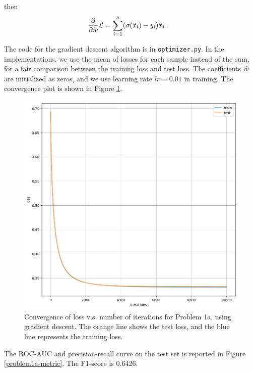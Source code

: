 \documentclass{article}%
\begin{document}
\begin{enumerate}
then
\begin{equation}
\begin{aligned}
\frac{\partial}{\partial \hat{w}}\mathcal{L} &= \sum_{i=1}^{n}(\sigma(\hat{x}_i)-y_i)\hat{x}_i.
\end{aligned}
\end{equation}

The code for the gradient descent algorithm is in \texttt{optimizer.py}. In the implementations, we use the mean of losses for each sample instead of the sum, for a fair comparison between the training loss and test loss. The coefficients $\hat{w}$ are initialized as zeros, and we use learning rate $lr = 0.01$ in training. The convergence plot is shown in Figure \ref{problem1a-convergence}.

\begin{figure}[htbp]
\centering
\includegraphics[scale=0.4]{problem1a.png}
\caption{Convergence of loss v.s. number of iterations for Problem 1a, using gradient descent. The orange line shows the test loss, and the blue line represents the training loss.}
\label{problem1a-convergence}
\end{figure}

The ROC-AUC and precision-recall curve on the test set is reported in Figure \ref{problem1a-metric}. The F1-score is 0.6426.


\end{enumerate}
\end{document}
